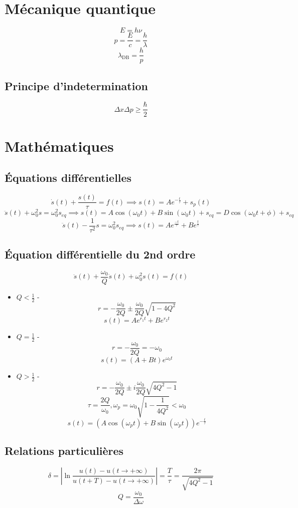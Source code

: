 \documentclass[]{article}
\begin{document}
\section{Mécanique quantique}

\[ E = h\nu \]
\[ p = \frac{E}{c} = \frac{h}{\lambda} \]
\[ \lambda_{\text{DB}} = \frac{h}{p} \]

\subsection*{Principe d'indetermination}
\[ \Delta x \Delta p \geq \frac{\hbar}{2} \]

\section{Mathématiques}

\subsection*{Équations différentielles}
\[ \dot{s}(t) + \frac{s(t)}{\tau} = f(t) \implies s(t) = Ae^{-\frac{t}{\tau}} + s_p(t) \] 
\[ \ddot{s}(t) + \omega_0^2s = \omega_0^2s_{eq} \implies s(t) = A\cos(\omega_0t)+B\sin(\omega_0t) + s_{eq} = D\cos(\omega_0t + \phi) + s_{eq} \]
\[ \ddot{s}(t) - \frac{1}{\tau ^ 2} s = \omega_0^2s_{eq} \implies s(t) = A e^{\frac{-t}{\tau}} + B e^{\frac{t}{\tau}} \]

\subsection*{Équation différentielle du 2nd ordre}
\[ \ddot{s}(t) + \frac{\omega_0}{Q}\dot{s}(t) + \omega_0^2s(t) = f(t) \]
\begin{itemize}
    \item $Q<\frac{1}{2}$ -
        \[ r = -\frac{\omega_0}{2Q} \pm \frac{\omega_0}{2Q}\sqrt{1-4Q^2} \]
        \[ s(t) = Ae^{r_1t} + Be^{r_2t} \]
    \item $Q=\frac{1}{2}$ -
        \[ r = -\frac{\omega_0}{2Q} = -\omega_0 \]
        \[ s(t) = (A + Bt)e^{\omega_0t} \]
    \item $Q>\frac{1}{2}$ -
        \[ r = -\frac{\omega_0}{2Q} \pm i\frac{\omega_0}{2Q}\sqrt{4Q^2-1} \]
        \[ \tau = \frac{2Q}{\omega_0}, \omega_p = \omega_0\sqrt{1-\frac{1}{4Q^2}} < \omega_0 \]
        \[ s(t) = (A\cos{(\omega_pt)} + B\sin{(\omega_pt)})e^{-\frac{t}{\tau}} \]
\end{itemize}

\subsection*{Relations particulières}
\[ \delta = |\ln{\frac{u(t) - u(t \rightarrow + \infty)}{u(t+T) - u(t \rightarrow + \infty)}}| = \frac{T}{\tau} = \frac{2\pi}{\sqrt{4Q^2-1}} \]
\[ Q = \frac{\omega_0}{\Delta \omega} \]
\end{document}
